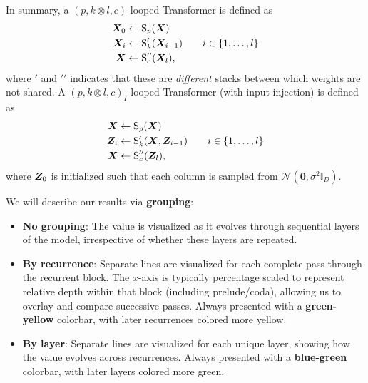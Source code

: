 In summary, a $(p, k \otimes l, c)$ looped Transformer is defined as
\begin{align*}
    {\bm{X}}_0 &\gets \operatorname{S}_p({\bm{X}}) \\
    {\bm{X}}_i &\gets \operatorname{S}_{k}^{\prime}({\bm{X}}_{i-1}) \qquad i \in \{1, \dots, l \} \\
    {\bm{X}} &\gets \operatorname{S}_c^{\prime \prime}({\bm{X}}_l),
\end{align*}
where $\prime$ and $\prime \prime$ indicates that these are \emph{different} stacks between which weights are not shared. A $(p, k \otimes l, c)_I$ looped Transformer (with input injection) is defined as
\begin{align*}
    {\bm{X}} &\gets \operatorname{S}_p({\bm{X}}) \\
    {\bm{Z}}_i &\gets \operatorname{S}_{k}^{\prime}({\bm{X}}, {\bm{Z}}_{i-1}) \qquad i \in \{1, \dots, l \} \\
    {\bm{X}} &\gets \operatorname{S}_c^{\prime \prime}({\bm{Z}}_l),
\end{align*}
where ${\bm{Z}}_0$ is initialized such that each column is sampled from $\mathcal{N}(\boldsymbol{0}, \sigma^2 \mathbb{I}_{D})$.


We will describe our results via \textbf{grouping}:
\begin{itemize}
    \item \textbf{No grouping}: The value is visualized as it evolves through sequential layers of the model, irrespective of whether these layers are repeated.
    \item \textbf{By recurrence}: Separate lines are visualized for each complete pass through the recurrent block. The $x$-axis is typically percentage scaled to represent relative depth within that block (including prelude/coda), allowing us to overlay and compare successive passes. Always presented with a \textbf{\textcolor{mplsummergreen}{green}-\textcolor{mplsummeryellow}{yellow}} colorbar, with later recurrences colored more yellow.
    \item \textbf{By layer}: Separate lines are visualized for each unique layer, showing how the value evolves across recurrences. Always presented with a \textbf{\textcolor{mplwinterblue}{blue}-\textcolor{mplwintergreen}{green}} colorbar, with later layers colored more green.
\end{itemize}

